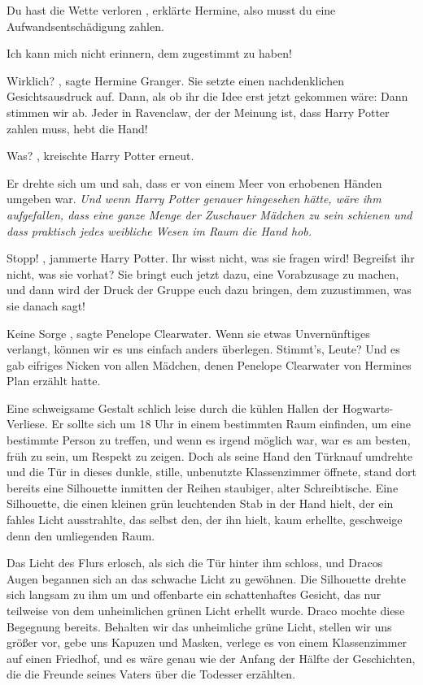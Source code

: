 \glqq Du hast die Wette verloren\grqq{} , erklärte Hermine, \glqq also musst du
eine Aufwandsentschädigung zahlen.\grqq{}

\glqq Ich kann mich nicht erinnern, dem zugestimmt zu haben!\grqq{}

\glqq Wirklich?\grqq{} , sagte Hermine Granger. Sie setzte einen nachdenklichen
Gesichtsausdruck auf. Dann, als ob ihr die Idee erst jetzt gekommen wäre: \glqq
Dann stimmen wir ab. Jeder in Ravenclaw, der der Meinung ist, dass Harry Potter
zahlen muss, hebt die Hand!\grqq{}

\glqq Was?\grqq{} , kreischte Harry Potter erneut.

Er drehte sich um und sah, dass er von einem Meer von erhobenen Händen umgeben
war. \emph{Und wenn Harry Potter genauer hingesehen hätte, wäre ihm aufgefallen,
dass eine ganze Menge der Zuschauer Mädchen zu sein schienen und dass praktisch
jedes weibliche Wesen im Raum die Hand hob.}

\glqq Stopp!\grqq{} , jammerte Harry Potter. \glqq Ihr wisst nicht, was sie
fragen wird! Begreifst ihr nicht, was sie vorhat? Sie bringt euch jetzt dazu,
eine Vorabzusage zu machen, und dann wird der Druck der Gruppe euch dazu
bringen, dem zuzustimmen, was sie danach sagt!\grqq{}

\glqq Keine Sorge\grqq{} , sagte Penelope Clearwater. \glqq Wenn sie etwas
Unvernünftiges verlangt, können wir es uns einfach anders überlegen. Stimmt's,
Leute?\grqq{} Und es gab eifriges Nicken von allen Mädchen, denen Penelope
Clearwater von Hermines Plan erzählt hatte.

Eine schweigsame Gestalt schlich leise durch die kühlen Hallen der
Hogwarts-Verliese. Er sollte sich um 18 Uhr in einem bestimmten Raum einfinden,
um eine bestimmte Person zu treffen, und wenn es irgend möglich war, war es am
besten, früh zu sein, um Respekt zu zeigen. Doch als seine Hand den Türknauf
umdrehte und die Tür in dieses dunkle, stille, unbenutzte Klassenzimmer öffnete,
stand dort bereits eine Silhouette inmitten der Reihen staubiger, alter
Schreibtische. Eine Silhouette, die einen kleinen grün leuchtenden Stab in der
Hand hielt, der ein fahles Licht ausstrahlte, das selbst den, der ihn hielt,
kaum erhellte, geschweige denn den umliegenden Raum.

Das Licht des Flurs erlosch, als sich die Tür hinter ihm schloss, und Dracos
Augen begannen sich an das schwache Licht zu gewöhnen. Die Silhouette drehte
sich langsam zu ihm um und offenbarte ein schattenhaftes Gesicht, das nur
teilweise von dem unheimlichen grünen Licht erhellt wurde. Draco mochte diese
Begegnung bereits. Behalten wir das unheimliche grüne Licht, stellen wir uns
größer vor, gebe uns Kapuzen und Masken, verlege es von einem Klassenzimmer auf
einen Friedhof, und es wäre genau wie der Anfang der Hälfte der Geschichten, die
die Freunde seines Vaters über die Todesser erzählten.

